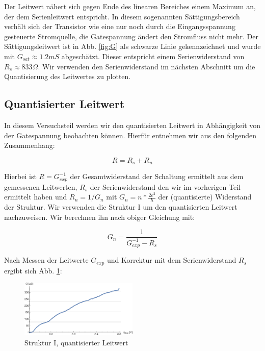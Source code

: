 \documentclass[aps,twocolumn,secnumarabic,nobalancelastpage,amsmath,amssymb,
nofootinbib,superscriptaddress]{revtex4-1}
\begin{document}
Der Leitwert nähert sich gegen Ende des linearen
Bereiches einem Maximum an, der dem Serienleitwert entspricht. In diesem sogenannten
Sättigungsbereich verhält sich der Transistor wie eine nur noch durch die Eingangsspannung
gesteuerte Stromquelle, die Gatespannung ändert den Stromfluss nicht mehr. Der
Sättigungsleitwert ist in Abb. \ref{fig:G} als schwarze Linie gekennzeichnet und
wurde mit $G_{sat} \approx 1.2 mS$ abgeschätzt. Dieser entspricht einem Serienwiderstand
von $R_s \approx 833 \Omega$. Wir verwenden den Serienwiderstand im nächsten Abschnitt
um die Quantisierung des Leitwertes zu plotten.


\subsection{Quantisierter Leitwert}
In diesem Versuchsteil werden wir den quantisierten Leitwert in Abhängigkeit von
der Gatespannung beobachten können. Hierfür entnehmen wir aus \cite{skript11}
den folgenden Zusammenhang:

  \begin{equation}
    R = R_s + R_n
  \end{equation}

Hierbei ist $R = G_{exp}^{-1}$ der Gesamtwiderstand der Schaltung ermittelt aus
dem gemessenen Leitwerten, $R_s$ der Serienwiderstand den wir im vorherigen Teil
ermittelt haben und $R_n = 1/G_n$ mit $G_n = n*\frac{2e^2}{h} $ der
(quantisierte) Widerstand der Struktur. Wir verwenden die Struktur I um den
quantisierten Leitwert nachzuweisen. Wir berechnen ihn nach obiger Gleichung mit:

  \begin{equation}
    G_n = \frac{1}{G_{exp}^{-1}-R_s}
  \end{equation}

Nach Messen der Leitwerte $G_{exp}$ und Korrektur mit dem Serienwiderstand $R_s$
ergibt sich Abb. \ref{fig:I}:

\begin{figure}[h]
  \centering
  \includegraphics[width=0.5\textwidth]{Berechnung-Bilder/j.eps}
  \caption{Struktur I, quantisierter Leitwert}
  \label{fig:I}
\end{figure}
\end{document}
